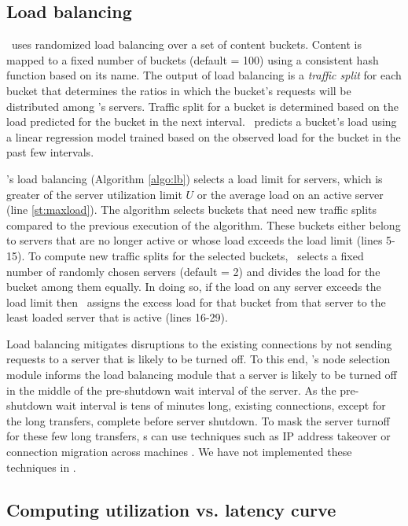 \subsection{Load balancing}
\label{sec:load-bal}
\shrink\  uses randomized load balancing over a set of content buckets. Content is mapped to a fixed number of buckets (default = 100) using a consistent hash function based on its name. The output of load balancing is a \emph{traffic split} for each bucket that determines the ratios in which the bucket's requests will be distributed among \cdc's servers. Traffic split for a bucket is determined based on the load predicted for the bucket in the next interval. \shrink\ predicts a bucket's load using a linear regression model trained based on the observed load for the bucket in the past few intervals.

\shrink's load balancing (Algorithm \ref{algo:lb}) selects a load limit for servers, which is greater of the server utilization limit $U$ or the average load on an active server (line \ref{st:maxload}). The algorithm selects buckets that need new traffic splits compared to the previous execution of the algorithm. These buckets either belong to servers that are no longer active or whose load exceeds the  load limit (lines 5-15). 
To compute new traffic splits for the selected buckets, \shrink\ selects a fixed number of randomly chosen servers (default = 2)  and divides the load for the bucket among them equally. In doing so, if the load on any server exceeds the load limit then \shrink\ assigns the excess load for that bucket from that server to the least loaded server that is active (lines 16-29). 

Load balancing mitigates disruptions to the existing connections by not sending requests to a server that is likely to be turned off. To this end, \shrink's node selection module informs the load balancing module that a server is likely to be turned off in the middle of the pre-shutdown wait interval of the server. As the pre-shutdown wait interval is tens of minutes long, existing connections, except for the long transfers, complete before server shutdown. To mask the server turnoff for these few long transfers, \cdc s can use techniques such as  IP address takeover \cite{flickenger2003linux} or connection migration across machines \cite{snoeren2001fine,sultan2002migratory}. We have not implemented these techniques in \shrink.

\subsection{Computing utilization vs. latency curve}
\label{sec:utilization-vs-responsetime}

